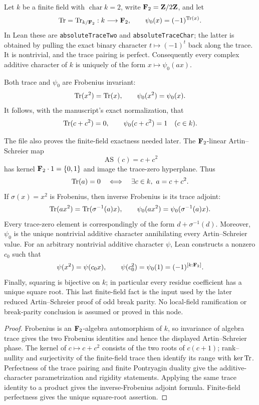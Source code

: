 \begin{theorem}\label{mod:finitefield-artinschreier}
Let $k$ be a finite field with $\operatorname{char}k=2$, write
$\mathbf F_2=\mathbf Z/2\mathbf Z$, and let
\[
 \operatorname{Tr}=\operatorname{Tr}_{k/\mathbf F_2}:k\longrightarrow\mathbf F_2,
 \qquad
 \psi_0(x)=(-1)^{\operatorname{Tr}(x)}.
\]
In Lean these are \texttt{absoluteTraceTwo} and
\texttt{absoluteTraceChar}; the latter is obtained by pulling the exact
binary character $t\mapsto(-1)^t$ back along the trace.  It is nontrivial,
and the trace pairing is perfect.  Consequently every complex additive
character of $k$ is uniquely of the form $x\mapsto\psi_0(ax)$.

Both trace and $\psi_0$ are Frobenius invariant:
\[
 \operatorname{Tr}(x^2)=\operatorname{Tr}(x),
 \qquad
 \psi_0(x^2)=\psi_0(x).
\]
It follows, with the manuscript's exact normalization, that
\[
 \operatorname{Tr}(c+c^2)=0,
 \qquad
 \psi_0(c+c^2)=1
 \quad(c\in k).
\]

The file also proves the finite-field exactness needed later.  The
$\mathbf F_2$-linear Artin--Schreier map
\[
 \operatorname{AS}(c)=c+c^2
\]
has kernel $\mathbf F_2\cdot1=\{0,1\}$ and image the trace-zero hyperplane.  Thus
\[
 \operatorname{Tr}(a)=0\quad\Longleftrightarrow\quad
 \exists c\in k,\ a=c+c^2.
\]
If $\sigma(x)=x^2$ is Frobenius, then inverse Frobenius is its trace
adjoint:
\[
 \operatorname{Tr}(ax^2)=\operatorname{Tr}(\sigma^{-1}(a)x),
 \qquad
 \psi_0(ax^2)=\psi_0(\sigma^{-1}(a)x).
\]
Every trace-zero element is correspondingly of the form
$d+\sigma^{-1}(d)$.  Moreover, $\psi_0$ is the unique nontrivial additive
character annihilating every Artin--Schreier value.  For an arbitrary
nontrivial additive character $\psi$, Lean constructs a nonzero $c_0$ such
that
\[
 \psi(x^2)=\psi(c_0x),
 \qquad
 \psi(c_0^2)=\psi_0(1)=(-1)^{[k:\mathbf F_2]}.
\]
Finally, squaring is bijective on $k$; in particular every residue
coefficient has a unique square root.  This last finite-field fact is the
input used by the later reduced Artin--Schreier proof of odd break parity.
No local-field ramification or break-parity conclusion is assumed or proved
in this node.
\leanok
{}
\FormalizationContract
\end{theorem}
\begin{proof}
Frobenius is an $\mathbf F_2$-algebra automorphism of $k$, so invariance of
algebra trace gives the two Frobenius identities and hence the displayed
Artin--Schreier phase.  The kernel of $c\mapsto c+c^2$ consists of the two
roots of $c(c+1)$; rank--nullity and surjectivity of the finite-field trace
then identify its range with $\ker\operatorname{Tr}$.  Perfectness of the trace pairing
and finite Pontryagin duality give the additive-character parametrization
and rigidity statements.  Applying the same trace identity to a product
gives the inverse-Frobenius adjoint formula.  Finite-field perfectness gives
the unique square-root assertion.
\end{proof}
